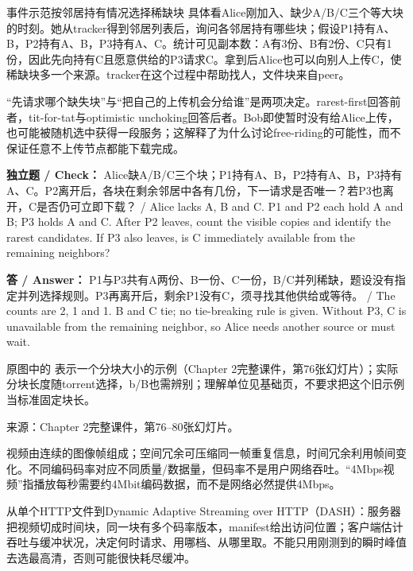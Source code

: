 \begin{StudyBlock}{事件示范}{按邻居持有情况选择稀缺块}
具体看Alice刚加入、缺少A/B/C三个等大块的时刻。她从tracker得到邻居列表后，询问各邻居持有哪些块；假设P1持有A、B，P2持有A、B，P3持有A、C。统计可见副本数：A有3份、B有2份、C只有1份，因此先向持有C且愿意供给的P3请求C。拿到后Alice也可以向别人上传C，使稀缺块多一个来源。tracker在这个过程中帮助找人，文件块来自peer。
\end{StudyBlock}


“先请求哪个缺失块”与“把自己的上传机会分给谁”是两项决定。rarest-first回答前者，tit-for-tat与optimistic unchoking回答后者。Bob即使暂时没有给Alice上传，也可能被随机选中获得一段服务；这解释了为什么讨论free-riding的可能性，而不保证任意不上传节点都能下载完成。


\textbf{独立题 / Check：} Alice缺A/B/C三个块；P1持有A、B，P2持有A、B，P3持有A、C。P2离开后，各块在剩余邻居中各有几份，下一请求是否唯一？若P3也离开，C是否仍可立即下载？ / Alice lacks A, B and C. P1 and P2 each hold A and B; P3 holds A and C. After P2 leaves, count the visible copies and identify the rarest candidates. If P3 also leaves, is C immediately available from the remaining neighbors?


\textbf{答 / Answer：} P1与P3共有A两份、B一份、C一份，B/C并列稀缺，题设没有指定并列选择规则。P3再离开后，剩余P1没有C，须寻找其他供给或等待。 / The counts are 2, 1 and 1. B and C tie; no tie-breaking rule is given. Without P3, C is unavailable from the remaining neighbor, so Alice needs another source or must wait.


原图中的  表示一个分块大小的示例（Chapter 2完整课件，第76张幻灯片）；实际分块长度随torrent选择，b/B也需辨别；理解单位见基础页，不要求把这个旧示例当标准固定块长。


来源：Chapter 2完整课件，第76–80张幻灯片。








视频由连续的图像帧组成；空间冗余可压缩同一帧重复信息，时间冗余利用帧间变化。不同编码码率对应不同质量/数据量，但码率不是用户网络吞吐。“4Mbps视频”指播放每秒需要约4Mbit编码数据，而不是网络必然提供4Mbps。


从单个HTTP文件到Dynamic Adaptive Streaming over HTTP（DASH）：服务器把视频切成时间块，同一块有多个码率版本，manifest给出访问位置；客户端估计吞吐与缓冲状况，决定何时请求、用哪档、从哪里取。不能只用刚测到的瞬时峰值去选最高清，否则可能很快耗尽缓冲。


